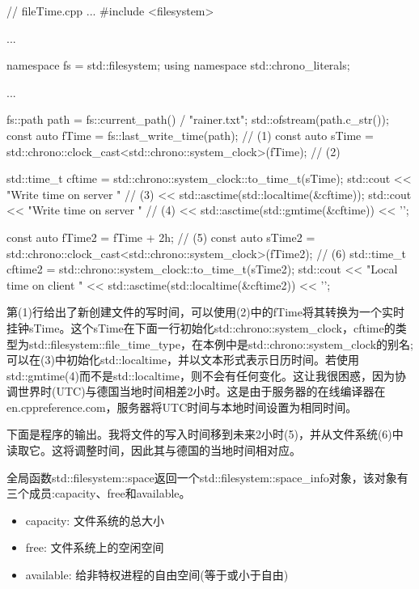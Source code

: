 \begin{cpp}
// fileTime.cpp
...
#include <filesystem>

...

namespace fs = std::filesystem;
using namespace std::chrono_literals;

...

fs::path path = fs::current_path() / "rainer.txt";
std::ofstream(path.c_str());
const auto fTime = fs::last_write_time(path); // (1)
const auto sTime = std::chrono::clock_cast<std::chrono::system_clock>(fTime); // (2)


std::time_t cftime = std::chrono::system_clock::to_time_t(sTime);
std::cout << "Write time on server " // (3)
		  << std::asctime(std::localtime(&cftime));
std::cout << "Write time on server " // (4)
		  << std::asctime(std::gmtime(&cftime)) << '\n';

const auto fTime2 = fTime + 2h; // (5)
const auto sTime2 = std::chrono::clock_cast<std::chrono::system_clock>(fTime2); // (6)
std::time_t cftime2 = std::chrono::system_clock::to_time_t(sTime2);
std::cout << "Local time on client "
		  << std::asctime(std::localtime(&cftime2)) << '\n';
\end{cpp}

第(1)行给出了新创建文件的写时间，可以使用(2)中的fTime将其转换为一个实时挂钟sTime。这个sTime在下面一行初始化std::chrono::system\_clock，cftime的类型为std::filesystem::file\_time\_type，在本例中是std::chrono::system\_clock的别名;可以在(3)中初始化std::localtime，并以文本形式表示日历时间。若使用std::gmtime(4)而不是std::localtime，则不会有任何变化。这让我很困惑，因为协调世界时(UTC)与德国当地时间相差2小时。这是由于服务器的在线编译器在en.cppreference.com，服务器将UTC时间与本地时间设置为相同时间。

下面是程序的输出。我将文件的写入时间移到未来2小时(5)，并从文件系统(6)中读取它。这将调整时间，因此其与德国的当地时间相对应。



全局函数std::filesystem::space返回一个std::filesystem::space\_info对象，该对象有三个成员:capacity、free和available。

\begin{itemize}
\item 
capacity: 文件系统的总大小

\item 
free: 文件系统上的空闲空间

\item 
available: 给非特权进程的自由空间(等于或小于自由)
\end{itemize}

